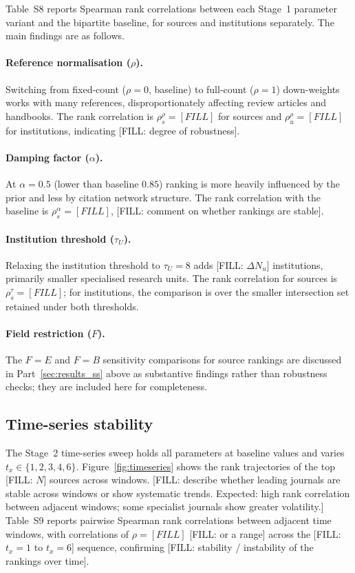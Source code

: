 Table~S8 reports Spearman rank correlations between each Stage~1
parameter variant and the bipartite baseline, for sources and
institutions separately.
The main findings are as follows.

\paragraph{Reference normalisation ($\rho$).}
Switching from fixed-count ($\rho=0$, baseline) to full-count ($\rho=1$)
down-weights works with many references, disproportionately affecting
review articles and handbooks. The rank correlation is
$\rho_s^{\rho}=[FILL]$ for sources and $\rho_u^{\rho}=[FILL]$ for
institutions, indicating [FILL: degree of robustness].

\paragraph{Damping factor ($\alpha$).}
At $\alpha=0.5$ (lower than baseline $0.85$) ranking is more heavily
influenced by the prior and less by citation network structure.
The rank correlation with the baseline is $\rho_s^{\alpha}=[FILL]$,
[FILL: comment on whether rankings are stable].

\paragraph{Institution threshold ($\tau_U$).}
Relaxing the institution threshold to $\tau_U=8$ adds [FILL: $\Delta N_u$]
institutions, primarily smaller specialised research units.
The rank correlation for sources is $\rho_s^{\tau}=[FILL]$;
for institutions, the comparison is over the smaller intersection set
retained under both thresholds.

\paragraph{Field restriction ($F$).}
The $F=E$ and $F=B$ sensitivity comparisons for source rankings are
discussed in Part~\ref{sec:results_ss} above as substantive findings
rather than robustness checks; they are included here for completeness.

\subsection{Time-series stability}
\label{sec:results_timeseries}

The Stage~2 time-series sweep holds all parameters at baseline values
and varies $t_x\in\{1,2,3,4,6\}$.
Figure~\ref{fig:timeseries} shows the rank trajectories of the top
[FILL: $N$] sources across windows.
[FILL: describe whether leading journals are stable across windows or
show systematic trends. Expected: high rank correlation between adjacent
windows; some specialist journals show greater volatility.]
Table~S9 reports pairwise Spearman rank correlations between adjacent
time windows, with correlations of $\rho=[FILL]$ [FILL: or a range]
across the [FILL: $t_x=1$ to $t_x=6$] sequence, confirming [FILL:
stability / instability of the rankings over time].
